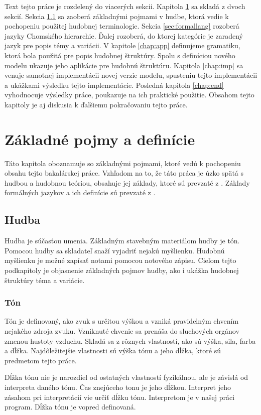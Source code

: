 Text tejto práce je rozdelený do viacerých sekcii. Kapitola \ref{chap:definitions} sa skladá z dvoch sekcií. Sekcia \ref{sec:music} sa zaoberá základnými pojmami v hudbe, ktorá vedie k pochopeniu použitej hudobnej terminologie. Sekcia \ref{sec:formallang} rozoberá jazyky Chomského hierarchie. Ďalej rozoberá, do ktorej kategórie je zaradený jazyk pre popis témy a variácii. V kapitole \ref{chap:app} definujeme gramatiku, ktorá bola použitá pre popis hudobnej štruktúry. Spolu s definíciou nového modelu ukazuje jeho aplikácie pre hudobnú štruktúru. Kapitola \ref{chap:imp} sa venuje samotnej implementácii novej verzie modelu, spusteniu tejto implementácii a ukážkami výsledku tejto implementácie. Posledná kapitola \ref{chap:end} vyhodnocuje výsledky práce, poukazuje na ich praktické použitie. Obsahom tejto kapitoly je aj diskusia k ďalšiemu pokračovaniu tejto práce. 


\chapter{Základné pojmy a definície}
\label{chap:definitions}
Táto kapitola oboznamuje so základnými pojmami, ktoré vedú k pochopeniu obsahu tejto bakalárskej práce. Vzhľadom na to, že táto práca je úzko spätá s hudbou a hudobnou teóriou, obsahuje jej základy, ktoré sú prevzaté z \cite{MUSICTHEORY, DunnettVar}. Základy formálných jazykov a ich definície sú prevzaté z \cite{MEDUNATHEORY}.

\section{Hudba}
\label{sec:music}
Hudba je súčasťou umenia. Základným stavebným materiálom hudby je tón. Pomocou hudby sa skladateľ snaží vyjadriť nejakú myšlienku. Hudobnú myšlienku je možné zapísať notami pomocou notového zápisu. Cieľom tejto podkapitoly je objasnenie základných pojmov hudby, ako i ukážka hudobnej štruktúry téma a variácie.

\subsection{Tón}
Tón je definovaný, ako zvuk s určitou výškou a vzniká pravidelným chvením nejakého zdroja zvuku. Vzniknuté chvenie sa prenáša do sluchových orgánov zmenou hustoty vzduchu. Skladá sa z rôznych vlastností, ako sú výška, sila, farba a dĺžka. Najdôležitejšie vlastnosti sú výška tónu a jeho dĺžka, ktoré sú predmetom tejto práce.

Dĺžka tónu nie je narozdiel od ostatných vlastností fyzikálnou, ale je závislá od interpreta daného tónu. Čas znejúceho tonu je jeho dĺžkou. Interpret jeho zásahom pri interpretácií vie určiť dĺžku tónu. Interpretom je v našej práci program. Dĺžka tónu je vopred definovaná.

